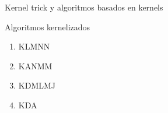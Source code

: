 \documentclass[10pt, compress]{beamer}
\begin{document}
\begin{frame}{Kernel trick y algoritmos basados en kernels}
{\begin{minipage}[t]{1.25\textwidth}
    \begin{exampleblock}{Algoritmos kernelizados}
      \begin{multicols}{4}
      \begin{enumerate}
        \item KLMNN
        \item KANMM
        \item KDMLMJ
        \item KDA
      \end{enumerate}
      \end{multicols}
    \end{exampleblock}
  \end{minipage}
  }

\end{frame}

\end{document}
